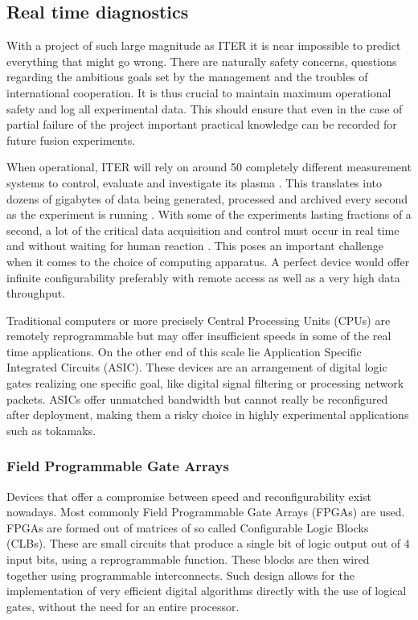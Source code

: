 \subsection{Real time diagnostics}

	With a project of such large magnitude as ITER it is near impossible to predict
	everything that might go wrong. There are naturally safety concerns,
	questions regarding the ambitious goals set by the management and
	the troubles of international cooperation\cite{iter_delays}.
	It is thus crucial to maintain maximum operational safety 
	and log all experimental data. This should ensure that even in the 
	case of partial failure of the project important practical knowledge
	can be recorded for future fusion experiments.


	When operational, ITER will rely on around 50 completely different
	measurement systems to control, evaluate and investigate its plasma 
	\cite{iter_diagnostics_count}.
	This translates into dozens of gigabytes of data being generated, 
	processed and archived every second as the experiment is running 
	\cite{iter_data_throughput}.
	With some of the experiments lasting fractions of a second,
	a lot of the critical data acquisition and control must occur
	in real time and without waiting for human reaction 
	\cite{iter_realtime_processing}.
	This poses an important challenge when it comes to the choice
	of computing apparatus. A perfect device would offer
	infinite configurability preferably with remote access 
	as well as a very high data throughput. 


	Traditional computers or more precisely Central Processing Units (CPUs) 
	are remotely reprogrammable but may offer insufficient speeds in 
	some of the real time applications. On the other end of this scale lie 
	Application Specific Integrated Circuits (ASIC). These devices are an 
	arrangement of digital logic gates realizing one specific goal, like 
	digital signal filtering or processing network packets.
	ASICs offer unmatched bandwidth but cannot really be reconfigured
	after deployment, making them a risky choice in highly experimental
	applications such as tokamaks.

  \subsubsection{Field Programmable Gate Arrays}
    Devices that offer a compromise between speed and reconfigurability
    exist nowadays. Most commonly Field Programmable Gate Arrays (FPGAs) are used.
    FPGAs are formed out of matrices of so called Configurable Logic Blocks (CLBs).
    These are small circuits that produce a single bit of logic output
    out of 4 input bits, using a reprogrammable function. These blocks 
    are then wired together using programmable interconnects. Such design 
    allows for the implementation of very efficient digital algorithms
    directly with the use of logical gates, without the need for an
    entire processor. \cite{xilinx_what_is_fpga}


